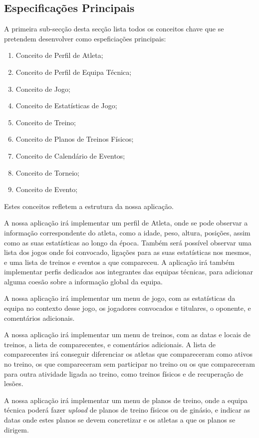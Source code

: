 \subsection{Especificações Principais} \label{sec221}
A primeira sub-secção desta secção lista todos os conceitos chave que se pretendem desenvolver como espeficiações principais:
\begin{enumerate}
	\item Conceito de Perfil de Atleta;
	\item Conceito de Perfil de Equipa Técnica;
	\item Conceito de Jogo;
	\item Conceito de Estatísticas de Jogo;
	\item Conceito de Treino;
	\item Conceito de Planos de Treinos Físicos;
	\item Conceito de Calendário de Eventos;
	\item Conceito de Torneio;
	\item Conceito de Evento;
\end{enumerate}

Estes conceitos refletem a estrutura da nossa aplicação. 

A nossa aplicação irá implementar um perfil de Atleta, onde se pode observar a informação correspondente do atleta, como a idade, peso, altura, posições, assim como as suas estatísticas ao longo da época. Também será possível observar uma lista dos jogos onde foi convocado, ligações para as suas estatísticas nos mesmos, e uma lista de treinos e eventos a que compareceu. A aplicação irá também implementar perfis dedicados aos integrantes das equipas técnicas, para adicionar alguma coesão sobre a informação global da equipa.

A nossa aplicação irá implementar um menu de jogo, com as estatísticas da equipa no contexto desse jogo, os jogadores convocados e titulares, o oponente, e comentários adicionais.

A nossa aplicação irá implementar um menu de treinos, com as datas e locais de treinos, a lista de comparecentes, e comentários adicionais. A lista de comparecentes irá conseguir diferenciar os atletas que compareceram como ativos no treino, os que compareceram sem participar no treino ou os que compareceram para outra atividade ligada ao treino, como treinos físicos e de recuperação de lesões.

A nossa aplicação irá implementar um menu de planos de treino, onde a equipa técnica poderá fazer \emph{upload} de planos de treino físicos ou de ginásio, e indicar as datas onde estes planos se devem concretizar e os atletas a que os planos se dirigem.


